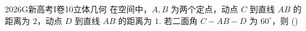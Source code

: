 
\begin{problem}{2026}{G}{新高考I卷}{10}{立体几何}
在空间中，$ A,B $ 为两个定点，动点 $ C $ 到直线 $ AB $ 的距离为 $ 2 $，动点 $ D $ 到直线 $ AB $ 的距离为 $ 1 $. 若二面角 $ C-AB-D $ 为 $ 60^\circ $，则 (\hspace{1cm})
\begin{choices}
\end{choices}
\end{problem}

\begin{answer}
\end{answer}

\begin{solutions}
\end{solutions}